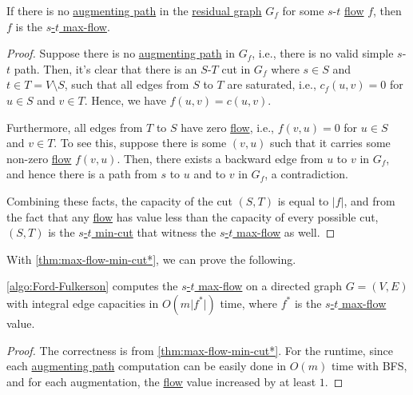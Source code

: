 \begin{theorem}\label{thm:max-flow-min-cut*}
	If there is no \hyperref[def:augmenting-path]{augmenting path} in the \hyperref[def:residual-graph]{residual graph} \(G_f\) for some \(s\)-\(t\) \hyperref[def:flow]{flow} \(f\), then \(f\) is the \hyperref[prb:s-t-max-flow]{\(s\)-\(t\) max-flow}.
\end{theorem}
\begin{proof}
	Suppose there is no \hyperref[def:augmenting-path]{augmenting path} in \(G_f\), i.e., there is no valid simple \(s\)-\(t\) path. Then, it's clear that there is an \(S\)-\(T\) cut in \(G_f\) where \(s \in S\) and \(t \in T = V \setminus S\), such that all edges from \(S\) to \(T\) are saturated, i.e., \(c_f(u, v) = 0\) for \(u \in S\) and \(v \in T\). Hence, we have \(f(u, v) = c(u, v)\).

	Furthermore, all edges from \(T\) to \(S\) have zero \hyperref[def:flow]{flow}, i.e., \(f(v, u) = 0\) for \(u \in S\) and \(v \in T\). To see this, suppose there is some \((v, u)\) such that it carries some non-zero \hyperref[def:flow]{flow} \(f(v, u)\). Then, there exists a backward edge from \(u\) to \(v\) in \(G_f\), and hence there is a path from \(s\) to \(u\) and to \(v\) in \(G_f\), a contradiction.

	Combining these facts, the capacity of the cut \((S, T)\) is equal to \(\lvert f \rvert \), and from the fact that any \hyperref[def:flow]{flow} has value less than the capacity of every possible cut, \((S, T)\) is the \hyperref[prb:s-t-min-cut]{\(s\)-\(t\) min-cut} that witness the \hyperref[prb:s-t-max-flow]{\(s\)-\(t\) max-flow} as well.
\end{proof}

With \autoref{thm:max-flow-min-cut*}, we can prove the following.

\begin{theorem}\label{thm:Ford-Fulkerson}
	\autoref{algo:Ford-Fulkerson} computes the \hyperref[prb:s-t-max-flow]{\(s\)-\(t\) max-flow} on a directed graph \(G = (V, E)\) with integral edge capacities in \(O(m \lvert f^{\ast} \rvert)\) time, where \(f^{\ast} \) is the \hyperref[prb:s-t-max-flow]{\(s\)-\(t\) max-flow} value.
\end{theorem}
\begin{proof}
	The correctness is from \autoref{thm:max-flow-min-cut*}. For the runtime, since each \hyperref[def:augmenting-path]{augmenting path} computation can be easily done in \(O(m)\) time with BFS, and for each augmentation, the \hyperref[def:flow]{flow} value increased by at least \(1\).
\end{proof}

